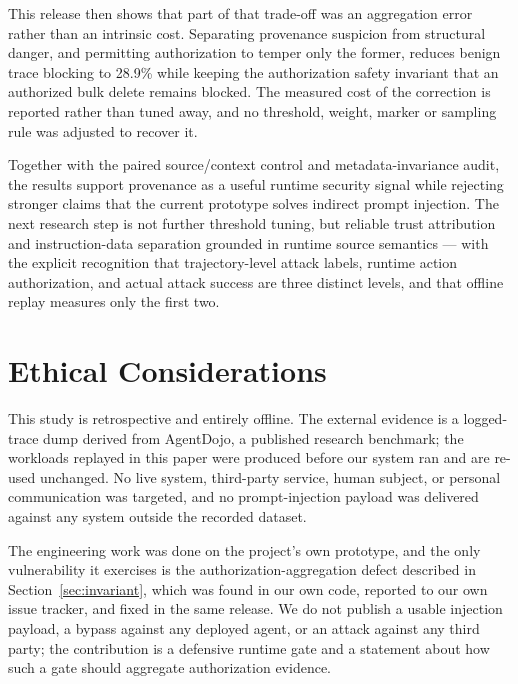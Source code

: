 \documentclass[letterpaper,twocolumn,10pt]{article}
\begin{document}
This release then shows that part of that trade-off was an aggregation error
rather than an intrinsic cost. Separating provenance suspicion from structural
danger, and permitting authorization to temper only the former, reduces benign
trace blocking to 28.9\% while keeping the authorization safety invariant that
an authorized bulk delete remains blocked. The measured cost of the correction
is reported rather than tuned away, and no threshold, weight, marker or sampling
rule was adjusted to recover it.

Together with the paired source/context control and metadata-invariance audit,
the results support provenance as a useful runtime security signal while
rejecting stronger claims that the current prototype solves indirect prompt
injection. The next research step is not further threshold tuning, but reliable
trust attribution and instruction-data separation grounded in runtime source
semantics --- with the explicit recognition that trajectory-level attack labels,
runtime action authorization, and actual attack success are three distinct
levels, and that offline replay measures only the first two.

\cleardoublepage
\appendix
\section*{Ethical Considerations}

This study is retrospective and entirely offline. The external evidence is a
logged-trace dump derived from AgentDojo, a published research benchmark; the
workloads replayed in this paper were produced before our system ran and are
re-used unchanged. No live system, third-party service, human subject, or
personal communication was targeted, and no prompt-injection payload was
delivered against any system outside the recorded dataset.

The engineering work was done on the project's own prototype, and the only
vulnerability it exercises is the authorization-aggregation defect described in
Section~\ref{sec:invariant}, which was found in our own code, reported to our own
issue tracker, and fixed in the same release. We do not publish a usable
injection payload, a bypass against any deployed agent, or an attack against any
third party; the contribution is a defensive runtime gate and a statement about
how such a gate should aggregate authorization evidence.
\end{document}
